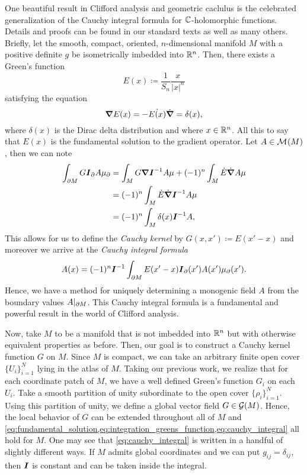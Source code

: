 One beautiful result in Clifford analysis and geometric caclulus is the celebrated generalization of the Cauchy integral formula for $\mathbb{C}$-holomorphic functions. Details and proofs can be found in our standard texts \cite{doran_geometric_2003,hestenes_clifford_1984} as well as many others. Briefly, let the smooth, compact, oriented, $n$-dimensional manifold $M$ with a positive definite $g$ be isometrically imbedded into $\mathbb{R}^n$. Then, there exists a Green's function
\begin{equation}
\label{eq:greens_function}
E(x)\coloneqq \frac{1}{S_n} \frac{x}{|x|^n}
\end{equation}
satisfying the equation
\begin{equation}
\label{eq:fundamental_solution}
\boldsymbol{\nabla} E(x) = -\dot{E(x)}\dot{\boldsymbol{\nabla}} = \delta(x),
\end{equation}
where $\delta(x)$ is the Dirac delta distribution and where $x\in \mathbb{R}^n$. All this to say that $E(x)$ is the fundamental solution to the gradient operator. Let $A \in \mathcal{M}^{}(M)$, then we can note
\begin{align}
\label{eq:integration_greens_function}
\int_{\partial M} G \boldsymbol{I}_\partial A \mu_\partial &= \int_M G\boldsymbol{\nabla} \boldsymbol{I}^{-1} A\mu + (-1)^n \int_M \dot{E}\dot{\boldsymbol{\nabla}} A\mu \\
&= (-1)^n\int_M \dot{E}\dot{\boldsymbol{\nabla}}\boldsymbol{I}^{-1} A \mu \\
&= (-1)^n \int_M \delta(x)\boldsymbol{I}^{-1} A,
\end{align}
This allows for us to define the \emph{Cauchy kernel} by $G(x,x')\coloneqq E(x'-x)$ and moreover we arrive at the \emph{Cauchy integral formula}
\begin{equation}
\label{eq:cauchy_integral}
A(x) = (-1)^n \boldsymbol{I}^{-1} \int_{\partial M} E(x'-x) \boldsymbol{I}_\partial(x') A(x') \mu_\partial(x').
\end{equation}
Hence, we have a method for uniquely determining a monogenic field $A$ from the boundary values $A\vert_{\partial M}$. This Cauchy integral formula is a fundamental and powerful result in the world of Clifford analysis. 

Now, take $M$ to be a manifold that is not imbedded into $\mathbb{R}^n$ but with otherwise equivalent properties as before. Then, our goal is to construct a Cauchy kernel function $G$ on $M$. Since $M$ is compact, we can take an arbitrary finite open cover $\{U_i\}_{i=1}^{N}$ lying in the atlas of $M$. Taking our previous work, we realize that for each coordinate patch of $M$, we have a well defined Green's function $G_i$ on each $U_i$. Take a smooth partition of unity subordinate to the open cover $\{\rho_i\}_{i=1}^N$. Using this partition of unity, we define a global vector field $G \in \mathcal{G}(M)$. Hence, the local behavior of $G$ can be extended throughout all of $M$ and \cref{eq:fundamental_solution,eq:integration_greens_function,eq:cauchy_integral} all hold for $M$. One may see that \cref{eq:cauchy_integral} is written in a handful of slightly different ways. If $M$ admits global coordinates and we can put $g_{ij}=\delta_{ij}$, then $\boldsymbol{I}$ is constant and can be taken inside the integral.

